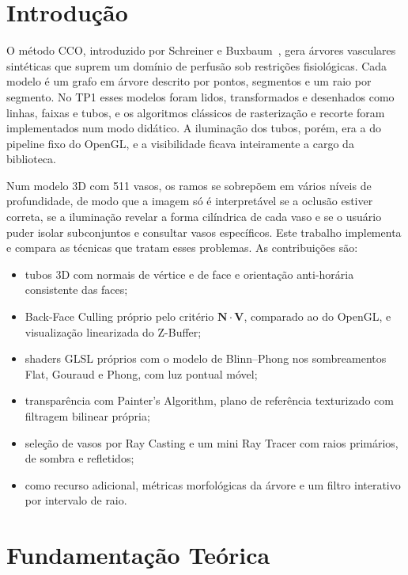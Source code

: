 \documentclass[11pt, a4paper]{article}
\newcommand{\vetor}[1]{\mathbf{#1}}
\begin{document}
\vspace{0.3cm}

\section{Introdução}

O método CCO, introduzido por Schreiner e Buxbaum~\cite{schreiner1993}, gera árvores vasculares sintéticas que suprem um domínio de perfusão sob restrições fisiológicas. Cada modelo é um grafo em árvore descrito por pontos, segmentos e um raio por segmento. No TP1 esses modelos foram lidos, transformados e desenhados como linhas, faixas e tubos, e os algoritmos clássicos de rasterização e recorte foram implementados num modo didático. A iluminação dos tubos, porém, era a do pipeline fixo do OpenGL, e a visibilidade ficava inteiramente a cargo da biblioteca.

Num modelo 3D com 511 vasos, os ramos se sobrepõem em vários níveis de profundidade, de modo que a imagem só é interpretável se a oclusão estiver correta, se a iluminação revelar a forma cilíndrica de cada vaso e se o usuário puder isolar subconjuntos e consultar vasos específicos. Este trabalho implementa e compara as técnicas que tratam esses problemas. As contribuições são:
\begin{itemize}[leftmargin=*]
  \item tubos 3D com normais de vértice e de face e orientação anti-horária consistente das faces;
  \item Back-Face Culling próprio pelo critério $\vetor{N} \cdot \vetor{V}$, comparado ao do OpenGL, e visualização linearizada do Z-Buffer;
  \item shaders GLSL próprios com o modelo de Blinn--Phong nos sombreamentos Flat, Gouraud e Phong, com luz pontual móvel;
  \item transparência com Painter's Algorithm, plano de referência texturizado com filtragem bilinear própria;
  \item seleção de vasos por Ray Casting e um mini Ray Tracer com raios primários, de sombra e refletidos;
  \item como recurso adicional, métricas morfológicas da árvore e um filtro interativo por intervalo de raio.
\end{itemize}

\section{Fundamentação Teórica}
\end{document}
